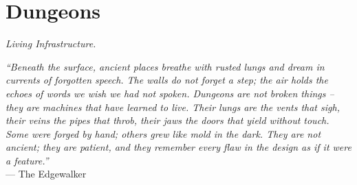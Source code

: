 \documentclass[12pt,oneside]{book}
\begin{document}


\newpage

\chapter{Dungeons}
\emph{Living Infrastructure.}

\noindent
\textit{``Beneath the surface, ancient places breathe with rusted lungs and dream in currents of forgotten speech. The walls do not forget a step; the air holds the echoes of words we wish we had not spoken. Dungeons are not broken things -- they are machines that have learned to live. Their lungs are the vents that sigh, their veins the pipes that throb, their jaws the doors that yield without touch. Some were forged by hand; others grew like mold in the dark. They are not ancient; they are patient, and they remember every flaw in the design as if it were a feature.''} \\
--- The Edgewalker
\end{document}
